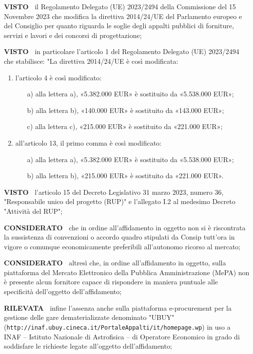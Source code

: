 \documentclass[a4paper,12pt]{letter}
\begin{document}
\textbf{VISTO~} il Regolamento Delegato (UE)
2023/2494 della Commissione del 15 Novembre 2023 che modifica la direttiva
2014/24/UE del Parlamento europeo e del Consiglio per quanto riguarda
le soglie degli appalti pubblici di forniture, servizi e lavori e dei
concorsi di progettazione;

\textbf{VISTO~}  in particolare l’articolo 1 del Regolamento Delegato (UE)
2023/2494 che stabilisce: "La direttiva 2014/24/UE è così modificata: 

\begin{enumerate}
\item l’articolo 4 è così modificato: 
\begin{enumerate}
\item[a)]  alla lettera a), «5.382.000 EUR» è sostituito da «5.538.000 EUR»;
\item[b)]  alla lettera b), «140.000 EUR» è sostituito da «143.000 EUR»; 
\item[c)]  alla lettera c), «215.000 EUR» è sostituito da «221.000 EUR»; 
\end{enumerate}

\item all’articolo 13, il primo comma è così modificato: 
\begin{enumerate}
\item[a)]  alla lettera a), «5.382.000 EUR» è sostituito da «5.538.000 EUR»; 
\item[b)]  alla lettera b), «215.000 EUR» è sostituito da «221.000 EUR».
\end{enumerate}
\end{enumerate}

\textbf{VISTO~} l’articolo 15 del Decreto Legislativo 31
marzo 2023, numero 36, "Responsabile unico del progetto (RUP)" e
l’allegato I.2 al medesimo Decreto "Attività del RUP";

\textbf{CONSIDERATO~} che in ordine all’affidamento in oggetto
non si è riscontrata la sussistenza di convenzioni o accordo quadro
stipulati da Consip tutt’ora in vigore o comunque economicamente
preferibili all’autonomo ricorso al mercato;

\textbf{CONSIDERATO~} altresì che, in ordine
all’affidamento in oggetto, sulla piattaforma del Mercato Elettronico
della Pubblica Amministrazione (MePA) non è presente alcun fornitore
capace di rispondere in maniera puntuale alle specificità dell’oggetto
dell’affidamento;

\textbf{RILEVATA~} infine l’assenza anche sulla piattaforma e-procurement per la
gestione delle gare dematerializzate denominato "UBUY"
(\texttt{http://inaf.ubuy.cineca.it/PortaleAppalti/it/homepage.wp}) in uso a
INAF – Istituto Nazionale di Astrofisica – di Operatore Economico in
grado di soddisfare le richieste legate all’oggetto dell’affidamento;
\end{document}
